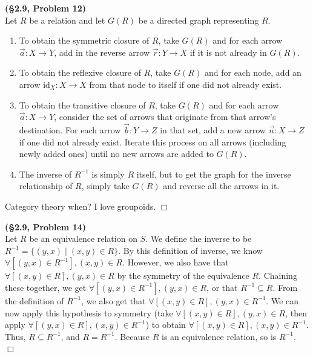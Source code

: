 \documentclass[12pt]{article}
\theoremstyle{definition}
\newenvironment{Solution}{\noindent {\sc Solution.}}{$\Box$ \vspace{2 ex}}
\begin{document}
\begin{Solution}
{\bf (\S2.9, Problem 12)}\\
Let $R$ be a relation and let $G(R)$ be a directed graph representing $R$.
\begin{enumerate}
    \item To obtain the symmetric closure of $R$, take $G(R)$ and for each arrow $\vec a : X \to Y$, add in the reverse arrow $\vec r : Y \to X$ if it is not already in $G(R)$.
    \item To obtain the reflexive closure of $R$, take $G(R)$ and for each node, add an arrow $\text{id}_X : X\to X$ from that node to itself if one did not already exist.
    \item To obtain the transitive closure of $R$, take $G(R)$ and for each arrow $\vec{a} : X\to Y$, consider the set of arrows that originate from that arrow's destination. For each arrow $\vec{b} : Y\to Z$ in that set, add a new arrow $\vec{n} : X \to Z$ if one did not already exist. Iterate this process on all arrows (including newly added ones) until no new arrows are added to $G(R)$.
    \item The inverse of $R^{-1}$ is simply $R$ itself, but to get the graph for the inverse relationship of $R$, simply take $G(R)$ and reverse all the arrows in it.
\end{enumerate}
Category theory when? I love groupoids.
\end{Solution}

\vspace{0.5cm}

\begin{Solution}
{\bf (\S2.9, Problem 14)}\\
Let $R$ be an equivalence relation on $S$. We define the inverse to be $R^{-1} =\{(y,x) \mid (x,y)\in R\}$. By this definition of inverse, we know $\forall[(y,x)\in R^{-1}], (x,y)\in R$. However, we also have that $\forall[(x,y)\in R],(y,x)\in R$ by the symmetry of the equivalence $R$. Chaining these together, we get $\forall[(y,x)\in R^{-1}],(y,x)\in R$, or that $R^{-1} \subseteq R$. From the definition of $R^{-1}$, we also get that $\forall[(x,y)\in R],(y,x)\in R^{-1}$. We can now apply this hypothesis to symmetry (take $\forall[(x,y)\in R],(y,x)\in R$, then apply $\forall[(y,x)\in R],(x,y)\in R^{-1}$) to obtain $\forall[(x,y)\in R],(x,y)\in R^{-1}$. Thus, $R\subseteq R^{-1}$, and $R=R^{-1}$. Because $R$ is an equivalence relation, so is $R^{-1}$.
\end{Solution}

\vspace{0.5cm}
\end{document}
